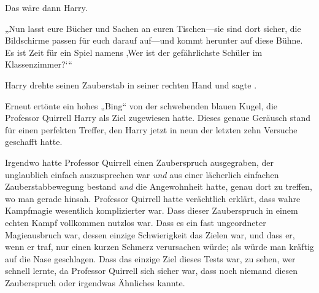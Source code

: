 Das wäre dann Harry.

„Nun lasst eure Bücher und Sachen an euren Tischen—sie sind dort sicher, die Bildschirme passen für euch darauf auf—und kommt herunter auf diese Bühne. Es ist Zeit für ein Spiel namens ‚Wer ist der gefährlichste Schüler im Klassenzimmer?‘“

\later

Harry drehte seinen Zauberstab in seiner rechten Hand und sagte .

Erneut ertönte ein hohes „Bing“ von der schwebenden blauen Kugel, die Professor Quirrell Harry als Ziel zugewiesen hatte. Dieses genaue Geräusch stand für einen perfekten Treffer, den Harry jetzt in neun der letzten zehn Versuche geschafft hatte.

Irgendwo hatte Professor Quirrell einen Zauberspruch ausgegraben, der unglaublich einfach auszusprechen war \emph{und} aus einer lächerlich einfachen Zauberstabbewegung bestand \emph{und} die Angewohnheit hatte, genau dort zu treffen, wo man gerade hinsah. Professor Quirrell hatte verächtlich erklärt, dass wahre Kampfmagie wesentlich komplizierter war. Dass dieser Zauberspruch in einem echten Kampf vollkommen nutzlos war. Dass es ein fast ungeordneter Magieausbruch war, dessen einzige Schwierigkeit das Zielen war, und dass er, wenn er traf, nur einen kurzen Schmerz verursachen würde; als würde man kräftig auf die Nase geschlagen. Dass das einzige Ziel dieses Tests war, zu sehen, wer schnell lernte, da Professor Quirrell sich sicher war, dass noch niemand diesen Zauberspruch oder irgendwas Ähnliches kannte.

